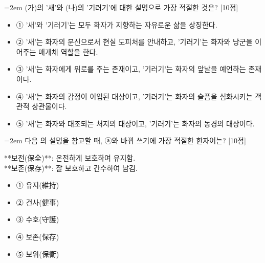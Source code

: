 \documentclass[10pt,a4paper]{article}
\newcommand{\qnum}[1]{%
  \tikz[baseline=(num.base)]{%
    \node[circle, fill=numCircle, text=white, inner sep=0pt,
          minimum size=18pt, font=\small\bfseries] (num) {#1};%
  }%
}
\newcommand{\pts}[1]{%
  \hfill\textcolor{ptsBadge}{[#1점]}%
}
\begin{document}
\vspace{4mm}
\begin{minipage}{\columnwidth}
{\hangindent=2em
\qnum{18}\enspace (가)의 '새'와 (나)의 '기러기'에 대한 설명으로 가장 적절한 것은? \pts{10}
\par}

\vspace{3mm}
\begin{itemize}[leftmargin=2.5em, labelsep=0.3em, label={}, itemsep=4pt, parsep=1pt, topsep=0pt]
  \item ① '새'와 '기러기'는 모두 화자가 지향하는 자유로운 삶을 상징한다.
  \item ② '새'는 화자의 분신으로서 현실 도피처를 안내하고, '기러기'는 화자와 낭군을 이어주는 매개체 역할을 한다.
  \item ③ '새'는 화자에게 위로를 주는 존재이고, '기러기'는 화자의 앞날을 예언하는 존재이다.
  \item ④ '새'는 화자의 감정이 이입된 대상이고, '기러기'는 화자의 슬픔을 심화시키는 객관적 상관물이다.
  \item ⑤ '새'는 화자와 대조되는 처지의 대상이고, '기러기'는 화자의 동경의 대상이다.
\end{itemize}
\end{minipage}
\vspace{4mm}

\vspace{4mm}
\begin{minipage}{\columnwidth}
{\hangindent=2em
\qnum{19}\enspace 다음 의 설명을 참고할 때, ⓐ와 바꿔 쓰기에 가장 적절한 한자어는? \pts{10}
\par}

\vspace{3mm}
\begin{tcolorbox}[bogi]
**보전(保全)**: 온전하게 보호하여 유지함. \\{}
**보존(保存)**: 잘 보호하고 간수하여 남김.
\end{tcolorbox}
\vspace{3mm}
\begin{itemize}[leftmargin=2.5em, labelsep=0.3em, label={}, itemsep=4pt, parsep=1pt, topsep=0pt]
  \item ① 유지(維持)
  \item ② 건사(健事)
  \item ③ 수호(守護)
  \item ④ 보존(保存)
  \item ⑤ 보위(保衛)
\end{itemize}
\end{minipage}
\vspace{4mm}
\end{document}

